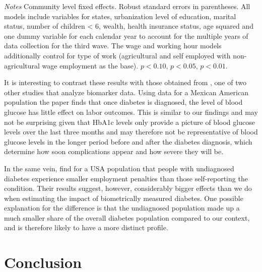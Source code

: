\documentclass[12pt,english]{article}
\begin{document}
\begin{table}[h]
\begin{center}
\begin{adjustbox}{max width=\linewidth}
\begin{threeparttable}
{\begin{tabular}{l*{6}{S
S}}
\bottomrule
\end{tabular}
\begin{tablenotes}
\item \footnotesize \textit{Notes} Community level fixed effects. Robust standard errors in parentheses. All models include variables for  states, urbanization level of education, marital status, number of children < 6, wealth, health insurance status, age squared and one dummy variable for each calendar year to account for the multiple years of data collection for the third wave. The wage and working hour models additionally control for type of work (agricultural and self employed with non-agricultural wage employment as the base). \sym{*} \(p<0.10\), \sym{**} \(p<0.05\), \sym{***} \(p<0.01\).
\end{tablenotes}
}
\end{threeparttable}
\end{adjustbox}
\end{center}
\end{table}


It is interesting to contrast these results with those obtained from \textcite{BrownIII2011}, one of two other studies that analyze biomarker data. Using data for a Mexican American population the paper finds that once diabetes is diagnosed, the level of blood glucose has
little effect on labor outcomes. This is similar to our findings and may not be surprising given that HbA1c levels only provide a picture of blood glucose levels over the last three months and may therefore not be representative of blood glucose levels in the longer period
before and after the diabetes diagnosis, which determine how soon complications appear and how severe they will be.

In the same vein, \textcite{Minor2015} find for a USA population that people with undiagnosed diabetes experience smaller employment penalties than those self-reporting the condition. Their results suggest, however, considerably bigger effects than we do when estimating the impact of biometrically measured diabetes. One possible explanation for the difference is that the undiagnosed population made up a much smaller share of the overall diabetes population compared to our context, and is therefore likely to have a more distinct profile.
\FloatBarrier


\section{\label{sec:cha_4_conclusion}Conclusion}
\end{document}
